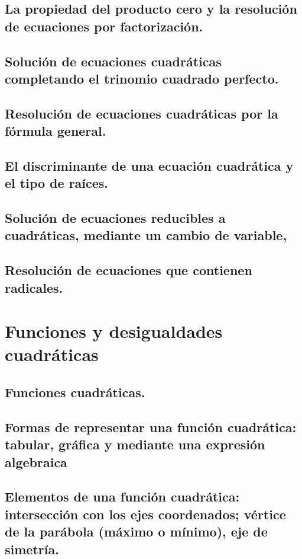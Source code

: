 \subsection{La propiedad del producto cero y la resolución de ecuaciones por factorización.}
\subsection{Solución de ecuaciones cuadráticas completando el trinomio cuadrado perfecto.}
\subsection{Resolución de ecuaciones cuadráticas por la fórmula general.}
\subsection{El discriminante de una ecuación cuadrática y el tipo de raíces.}
\subsection{Solución de ecuaciones reducibles a cuadráticas, mediante un cambio de variable,}
\subsection{Resolución de ecuaciones que contienen radicales.}







\section{Funciones y desigualdades cuadráticas} %
\subsection{Funciones cuadráticas.}
\subsection{Formas de representar una función cuadrática: tabular, gráfica y mediante una expresión algebraica}
\subsection{Elementos de una función cuadrática: intersección con los ejes coordenados; vértice de la parábola (máximo o mínimo), eje de simetría.}
